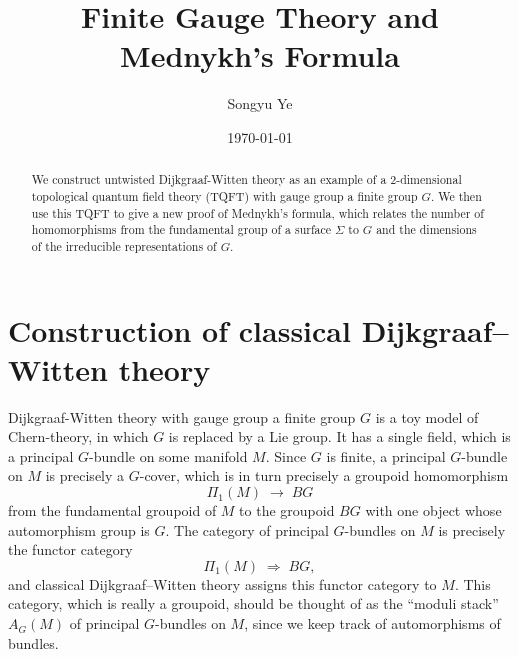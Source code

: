 \documentclass[12pt]{article}
\begin{document}
\rhead{\today}
\cfoot{\thepage}

\title{Finite Gauge Theory and Mednykh's Formula}

\author{Songyu Ye}
\date{\today}
\maketitle


\begin{abstract}
    We construct untwisted Dijkgraaf-Witten theory as an example of a 2-dimensional topological quantum field theory (TQFT) with gauge group a finite group $G$. We then use this TQFT to give a new proof of Mednykh's formula, which relates the number of homomorphisms from the fundamental group of a surface $\Sigma$ to $G$ and the dimensions of the irreducible representations of $G$.
\end{abstract}

\tableofcontents
\section{Construction of classical Dijkgraaf--Witten theory}
Dijkgraaf-Witten theory with gauge group a finite group $G$ is a toy model of Chern-theory, in which $G$ is replaced by a Lie group. It has a single field, which is a principal $G$-bundle on some manifold $M$. Since $G$ is finite, a principal $G$-bundle on $M$ is precisely a $G$-cover, which is in turn precisely a groupoid homomorphism
\[
    \Pi_1(M) \;\longrightarrow\; BG
    \tag{3}
\]
from the fundamental groupoid of $M$ to the groupoid $BG$ with one object whose automorphism group is $G$. The category of principal $G$-bundles on $M$ is precisely the functor category
\[
    \Pi_1(M) \;\Rightarrow\; BG,
\]
and classical Dijkgraaf--Witten theory assigns this functor category to $M$. This category, which is really a groupoid, should be thought of as the ``moduli stack'' $A_G(M)$ of principal $G$-bundles on $M$, since we keep track of automorphisms of bundles.
\end{document}

